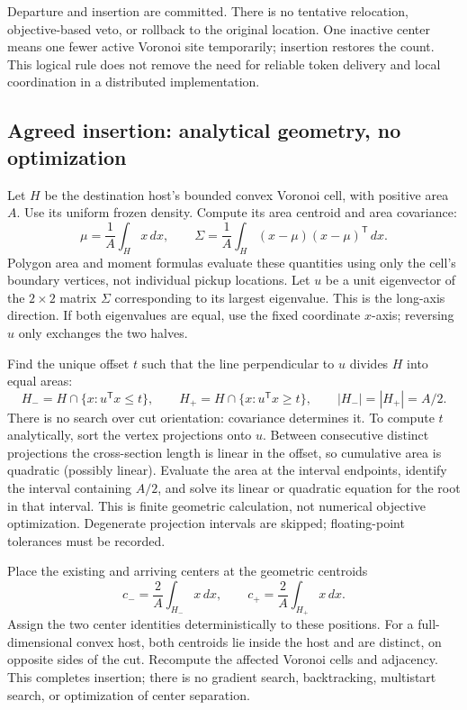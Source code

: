 Departure and insertion are committed. There is no tentative relocation,
objective-based veto, or rollback to the original location. One inactive center
means one fewer active Voronoi site temporarily; insertion restores the count.
This logical rule does not remove the need for reliable token delivery and
local coordination in a distributed implementation.

\subsection{Agreed insertion: analytical geometry, no optimization}
Let $H$ be the destination host's bounded convex Voronoi cell, with positive
area $A$. Use its uniform frozen density. Compute its area centroid and
area covariance:
\[
 \mu=\frac{1}{A}\int_H x\,dx,\qquad
 \Sigma=\frac{1}{A}\int_H (x-\mu)(x-\mu)^{\mathsf T}\,dx.
\]
Polygon area and moment formulas evaluate these quantities using only the
cell's boundary vertices, not individual pickup locations. Let $u$ be a unit
eigenvector of the $2\times2$ matrix $\Sigma$ corresponding to its largest
eigenvalue. This is the long-axis direction. If both eigenvalues are equal,
use the fixed coordinate $x$-axis; reversing $u$ only exchanges the two halves.

Find the unique offset $t$ such that the line perpendicular to $u$ divides
$H$ into equal areas:
\[
 H_- = H\cap\{x:u^{\mathsf T}x\leq t\},\qquad
 H_+ = H\cap\{x:u^{\mathsf T}x\geq t\},\qquad
 |H_-|=|H_+|=A/2.
\]
There is no search over cut orientation: covariance determines it. To compute
$t$ analytically, sort the vertex projections onto $u$. Between consecutive
distinct projections the cross-section length is linear in the offset, so
cumulative area is quadratic (possibly linear). Evaluate the area at the
interval endpoints, identify the interval containing $A/2$, and solve its
linear or quadratic equation for the root in that interval. This is finite
geometric calculation, not numerical objective optimization. Degenerate
projection intervals are skipped; floating-point tolerances must be recorded.

Place the existing and arriving centers at the geometric centroids
\[
 c_- = \frac{2}{A}\int_{H_-}x\,dx,\qquad
 c_+ = \frac{2}{A}\int_{H_+}x\,dx.
\]
Assign the two center identities deterministically to these positions. For a
full-dimensional convex host, both centroids lie inside the host and are
distinct, on opposite sides of the cut. Recompute the affected Voronoi cells
and adjacency. This completes insertion; there is no gradient search,
backtracking, multistart search, or optimization of center separation.

